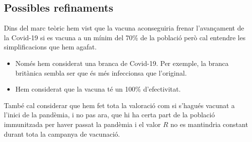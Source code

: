 \documentclass[a4paper, 11pt]{article}
\begin{document}
  \subsection{Possibles refinaments}
  Dins del marc teòric hem vist que la vacuna aconseguiria frenar l'avançament de la Covid-19 si es vacuna a un mínim del 70\% de la població però cal entendre les simplificacions que hem agafat.
  \begin{itemize}
    \item Només hem considerat una branca de Covid-19. Per exemple, la branca britànica sembla ser que és més infeccionsa que l'original.\cite{tg}
    \item Hem considerat que la vacuna té un 100\% d'efectivitat.
  \end{itemize}
  També cal considerar que hem fet tota la valoració com si s'hagués vacunat a l'inici de la pandèmia, i no pas ara, que hi ha certa part de la població immunitzada per haver passat la pandèmia i el valor $R$ no es mantindria constant durant tota la campanya de vacunació.
\end{document}
